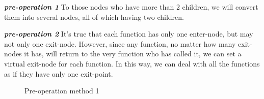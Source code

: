 \documentclass[12pt]{article}
\begin{document}
\textit{\textbf{pre-operation 1}} To those nodes who have more than 2 children, we will convert them into several nodes, all of which having two children.\

\textit{\textbf{pre-operation 2}} It's true that each function has only one enter-node, but may not only one exit-node. However, since any function, no matter how many exit-nodes it has, will return to the very function who has called it, we can set a virtual exit-node for each function. In this way, we can deal with all the functions as if they have only one exit-point.\\

\begin{figure}
\begin{center}
\begin{minipage}[c]{0.5\textwidth}
\centering
{}
\renewcommand{\figurename}{Figure}
\caption{Pre-operation method 1 }
\label{}
\end{minipage}%
\begin{minipage}[c]{0.5\textwidth}
\centering
{}

\end{minipage}
\end{center}
\end{figure}
\end{document}
